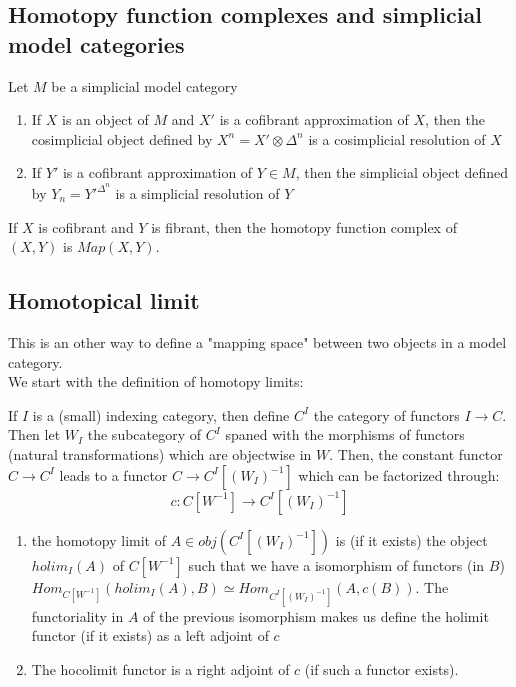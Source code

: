\subsection{Homotopy function complexes and simplicial model categories}

Let $M$ be a simplicial model category

\begin{prop}
\begin{enumerate}
\item If $X$ is an object of $M$ and $X'$ is a cofibrant approximation of $X$, then the cosimplicial object defined by $X^n = X' \otimes \Delta^n$ is a cosimplicial resolution of $X$
\item If $Y'$ is a cofibrant approximation of $Y \in M$, then the simplicial object defined by $Y_n = Y'^{\Delta^n}$ is a simplicial resolution of $Y$
\end{enumerate}
\end{prop}

\begin{cor}
If $X$ is cofibrant and $Y$ is fibrant, then the homotopy function complex of $(X,Y)$ is $Map(X,Y)$.
\end{cor}

\subsection{Homotopical limit}

This is an other way to define a "mapping space" between two objects in a model category.\\

We start with the definition of homotopy limits:

\begin{defin}
If $I$ is a (small) indexing category, then define $C^I$ the category of functors $I \rightarrow C$. Then let $W_I$ the subcategory of $C^I$ spaned with the morphisms of functors (natural transformations) which are objectwise in $W$. Then, the constant functor $C \rightarrow C^I$ leads to a functor $C \rightarrow C^I[(W_I)^{-1}]$ which can be factorized through:
\begin{equation}
c: C[W^{-1}] \rightarrow C^I[(W_I)^{-1}]
\end{equation}
\begin{enumerate}
\item the homotopy limit of $A \in obj(C^I[(W_I)^{-1}])$ is (if it exists) the object $holim_I(A)$ of $C[W^{-1}]$ such that we have a isomorphism of functors (in $B$) $Hom_{C[W^{-1}]}(holim_I(A),B) \simeq Hom_{C^I[(W_I)^{-1}]}(A, c(B))$. The functoriality in $A$ of the previous isomorphism makes us define the holimit functor (if it exists) as a left adjoint of $c$
\item The hocolimit functor is a right adjoint of $c$ (if such a functor exists).
\end{enumerate}
\end{defin}

